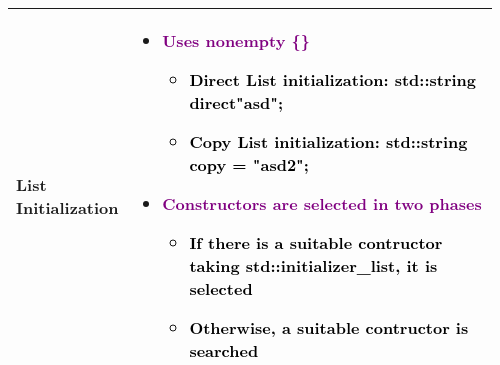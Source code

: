 \documentclass[main.tex,fontsize=8pt,paper=a4,paper=portrait,DIV=calc,]{scrartcl}
\begin{document}
\begin{table}[ht!]
\begin{tabular}{|m{0.2\linewidth}|m{0.755\linewidth}|}
\hline
List Initialization & 
\begin{itemize}
  \item \textcolor{purple}{Uses nonempty \{\}}
    \begin{itemize}
      \item \textcolor{black}{Direct List initialization: std::string direct{"asd"};}
      \item \textcolor{black}{Copy List initialization: std::string copy = {"asd2"};}
    \end{itemize} 
\item \textcolor{purple}{Constructors are selected in two phases}
  \begin{itemize}
  \item \textcolor{black}{If there is a suitable contructor taking std::initializer\_list, it is selected}
  \item \textcolor{black}{Otherwise, a suitable contructor is searched}
  \end{itemize} 
\vspace{-3mm}
\end{itemize} 
\\
\hline
\end{tabular}
\end{table}
\pagebreak
\end{document}
